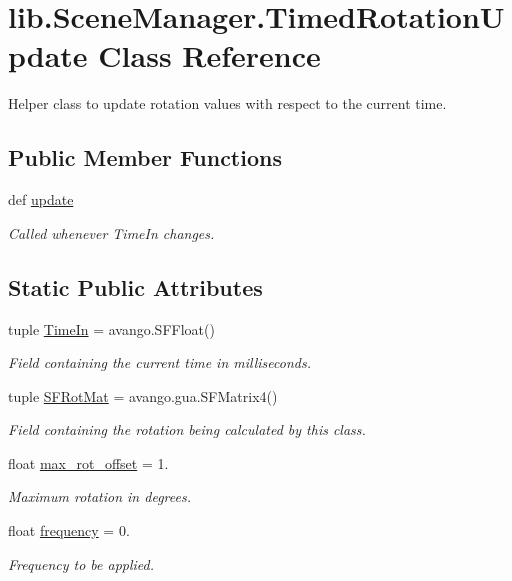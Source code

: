 \hypertarget{classlib_1_1SceneManager_1_1TimedRotationUpdate}{\section{lib.\-Scene\-Manager.\-Timed\-Rotation\-Update \-Class \-Reference}
\label{classlib_1_1SceneManager_1_1TimedRotationUpdate}
}


\-Helper class to update rotation values with respect to the current time.  


\subsection*{\-Public \-Member \-Functions}
\begin{DoxyCompactItemize}
\item 
def \hyperlink{classlib_1_1SceneManager_1_1TimedRotationUpdate_a421764c4c348ea77cd5b707822153ba6}{update}
\begin{DoxyCompactList}\small\item\em \-Called whenever \-Time\-In changes. \end{DoxyCompactList}\end{DoxyCompactItemize}
\subsection*{\-Static \-Public \-Attributes}
\begin{DoxyCompactItemize}
\item 
tuple \hyperlink{classlib_1_1SceneManager_1_1TimedRotationUpdate_a4036269956b4deac6562008b37bd773a}{\-Time\-In} = avango.\-S\-F\-Float()
\begin{DoxyCompactList}\small\item\em \-Field containing the current time in milliseconds. \end{DoxyCompactList}\item 
tuple \hyperlink{classlib_1_1SceneManager_1_1TimedRotationUpdate_a30342cb1a79a582bdd6c0546a73d328f}{\-S\-F\-Rot\-Mat} = avango.\-gua.\-S\-F\-Matrix4()
\begin{DoxyCompactList}\small\item\em \-Field containing the rotation being calculated by this class. \end{DoxyCompactList}\item 
float \hyperlink{classlib_1_1SceneManager_1_1TimedRotationUpdate_a4d509eb30537808c7e629e60bb5cd305}{max\-\_\-rot\-\_\-offset} = 1.
\begin{DoxyCompactList}\small\item\em \-Maximum rotation in degrees. \end{DoxyCompactList}\item 
float \hyperlink{classlib_1_1SceneManager_1_1TimedRotationUpdate_a3d5c2cdc5f4044b42d9d8e7ff1a87a3c}{frequency} = 0.
\begin{DoxyCompactList}\small\item\em \-Frequency to be applied. \end{DoxyCompactList}\end{DoxyCompactItemize}



